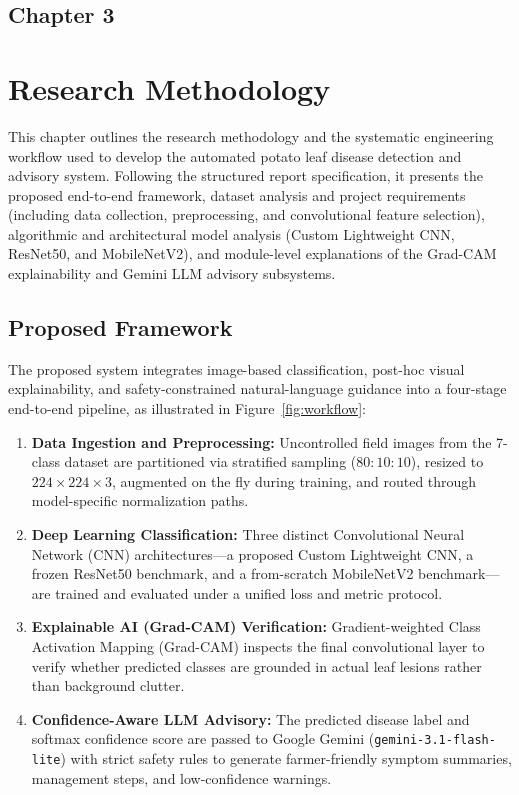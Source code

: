 \begin{center}
    \section*{\fontsize{20}{20}\selectfont Chapter 3}
\end{center}
\vspace{10mm}
\section{Research Methodology}

This chapter outlines the research methodology and the systematic engineering workflow used to develop the automated potato leaf disease detection and advisory system. Following the structured report specification, it presents the proposed end-to-end framework, dataset analysis and project requirements (including data collection, preprocessing, and convolutional feature selection), algorithmic and architectural model analysis (Custom Lightweight CNN, ResNet50, and MobileNetV2), and module-level explanations of the Grad-CAM explainability and Gemini LLM advisory subsystems.

\subsection{Proposed Framework}
The proposed system integrates image-based classification, post-hoc visual explainability, and safety-constrained natural-language guidance into a four-stage end-to-end pipeline, as illustrated in Figure~\ref{fig:workflow}:
\begin{enumerate}
    \item \textbf{Data Ingestion and Preprocessing:} Uncontrolled field images from the 7-class dataset are partitioned via stratified sampling ($80:10:10$), resized to $224 \times 224 \times 3$, augmented on the fly during training, and routed through model-specific normalization paths.
    \item \textbf{Deep Learning Classification:} Three distinct Convolutional Neural Network (CNN) architectures---a proposed Custom Lightweight CNN, a frozen ResNet50 benchmark, and a from-scratch MobileNetV2 benchmark---are trained and evaluated under a unified loss and metric protocol.
    \item \textbf{Explainable AI (Grad-CAM) Verification:} Gradient-weighted Class Activation Mapping (Grad-CAM) inspects the final convolutional layer to verify whether predicted classes are grounded in actual leaf lesions rather than background clutter.
    \item \textbf{Confidence-Aware LLM Advisory:} The predicted disease label and softmax confidence score are passed to Google Gemini (\texttt{gemini-3.1-flash-lite}) with strict safety rules to generate farmer-friendly symptom summaries, management steps, and low-confidence warnings.
\end{enumerate}

